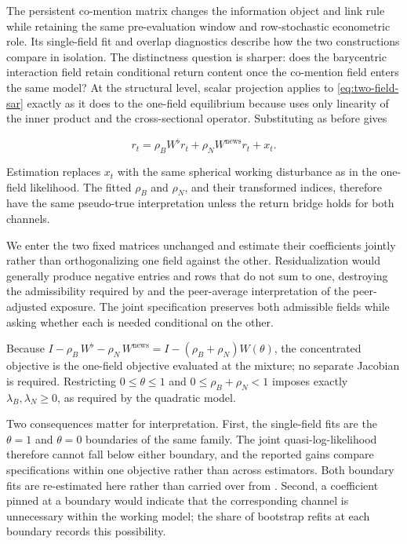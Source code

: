 The persistent co-mention matrix changes the information object and link rule
while retaining the same pre-evaluation window and row-stochastic econometric
role.
Its single-field fit and overlap diagnostics describe how the two constructions
compare in isolation.
The distinctness question is sharper: does the barycentric interaction field
retain conditional return content once the co-mention field enters the same
model?
At the structural level, scalar projection applies to
\eqref{eq:two-field-sar} exactly as it does to the one-field equilibrium because
 uses only linearity of the inner product and the
cross-sectional operator.
Substituting as before gives

\begin{equation}\label{eq:two-field-spatial-lag}
  r_t=\rho_B W^\flat r_t+\rho_N W^{\mathrm{news}}r_t+x_t .
\end{equation}

Estimation replaces $x_t$ with the same spherical working disturbance as in the
one-field likelihood.
The fitted $\rho_B$ and $\rho_N$, and their transformed indices, therefore have
the same pseudo-true interpretation unless the return bridge holds for both
channels.

We enter the two fixed matrices unchanged and estimate their coefficients
jointly rather than orthogonalizing one field against the other.
Residualization would generally produce negative entries and rows that do not
sum to one, destroying the admissibility required by
 and the peer-average interpretation of the
peer-adjusted exposure.
The joint specification preserves both admissible fields while asking whether
each is needed conditional on the other.

Because
$I-\rho_B\,W^\flat-\rho_N\,W^{\mathrm{news}}=I-(\rho_B+\rho_N)W(\theta)$,
the concentrated objective is the one-field objective evaluated at the mixture;
no separate Jacobian is required.
Restricting $0\leq\theta\leq1$ and $0\leq\rho_B+\rho_N<1$ imposes exactly
$\lambda_B,\lambda_N\geq0$, as required by the quadratic model.

Two consequences matter for interpretation.
First, the single-field fits are the $\theta=1$ and $\theta=0$ boundaries of the
same family.
The joint quasi-log-likelihood therefore cannot fall below either boundary, and
the reported gains compare specifications within one objective rather than
across estimators.
Both boundary fits are re-estimated here rather than carried over from
.
Second, a coefficient pinned at a boundary would indicate that the corresponding
channel is unnecessary within the working model; the share of bootstrap refits
at each boundary records this possibility.

